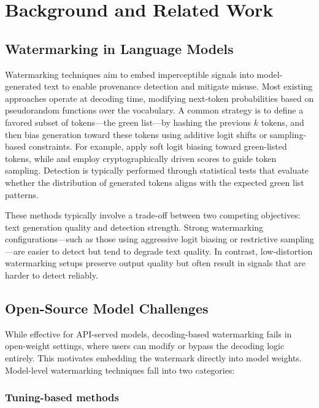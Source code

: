 \section{Background and Related Work}
\label{sec:background_related}

\subsection{Watermarking in Language Models}

Watermarking techniques aim to embed imperceptible signals into model-generated text to enable provenance detection and mitigate misuse. Most existing approaches operate at decoding time, modifying next-token probabilities based on pseudorandom functions over the vocabulary. A common strategy is to define a favored subset of tokens—the green list—by hashing the previous \(k\) tokens, and then bias generation toward these tokens using additive logit shifts or sampling-based constraints. For example, \citet{kirchenbauer2023watermark} apply soft logit biasing toward green-listed tokens, while \citet{aaronson2023reform} and \citet{kuditipudi2023robust} employ cryptographically driven scores to guide token sampling. Detection is typically performed through statistical tests that evaluate whether the distribution of generated tokens aligns with the expected green list patterns.

These methods typically involve a trade-off between two competing objectives: text generation quality and detection strength. Strong watermarking configurations—such as those using aggressive logit biasing or restrictive sampling—are easier to detect but tend to degrade text quality. In contrast, low-distortion watermarking setups preserve output quality but often result in signals that are harder to detect reliably.

\subsection{Open-Source Model Challenges}

While effective for API-served models, decoding-based watermarking fails in open-weight settings, where users can modify or bypass the decoding logic entirely. This motivates embedding the watermark directly into model weights. Model-level watermarking techniques fall into two categories:

\subsubsection{Tuning-based methods}

